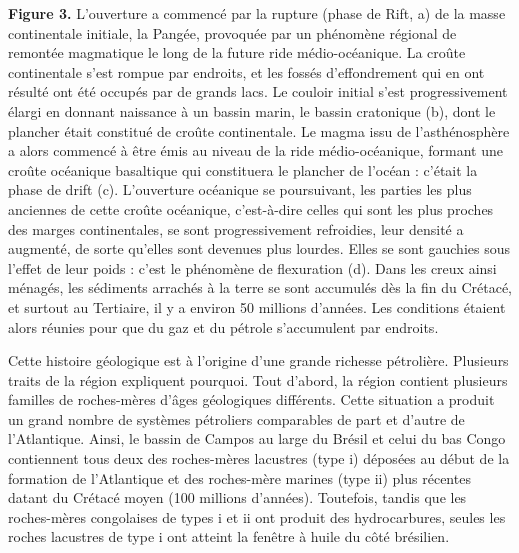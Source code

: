 \documentclass[8pt]{article}
\begin{document}
\begin{tcolorbox}[colback=white]
	\begin{center}
	\end{center}
	\textbf{Figure 3.} L’ouverture a commencé par la rupture (phase de Rift, a) de la masse continentale initiale, la Pangée, provoquée par un phénomène régional
	de remontée magmatique le long de la future ride médio-océanique.
	La croûte continentale s’est rompue par endroits, et les fossés d’effondrement qui en ont résulté ont été occupés par de grands lacs. Le couloir initial s’est progressivement élargi en donnant naissance à un bassin
	marin, le bassin cratonique (b), dont le plancher était constitué de croûte
	continentale. Le magma issu de l’asthénosphère a alors commencé à
	être émis au niveau de la ride médio-océanique, formant une croûte océanique basaltique qui constituera le plancher de l’océan : c’était la phase
	de drift (c). L’ouverture océanique se poursuivant, les parties les plus
	anciennes de cette croûte océanique, c’est-à-dire celles qui sont les plus
	proches des marges continentales, se sont progressivement refroidies,
	leur densité a augmenté, de sorte qu’elles sont devenues plus lourdes.
	Elles se sont gauchies sous l’effet de leur poids : c’est le phénomène de
	flexuration (d). Dans les creux ainsi ménagés, les sédiments arrachés
	à la terre se sont accumulés dès la fin du Crétacé, et surtout au Tertiaire, il y a environ 50 millions d’années. Les conditions étaient alors
	réunies pour que du gaz et du pétrole s’accumulent par endroits.
\end{tcolorbox}

\newpage
Cette histoire géologique est à l'origine d'une grande richesse pétrolière. Plusieurs traits de la région expliquent pourquoi. Tout d'abord, la région contient plusieurs familles de roches-mères d'âges géologiques différents. Cette situation a produit un grand nombre de systèmes pétroliers comparables de part et d'autre de l'Atlantique. Ainsi, le bassin de Campos au large du Brésil et celui du bas Congo contiennent tous deux des roches-mères lacustres (type i) déposées au début de la formation de l'Atlantique et des roches-mère marines (type ii) plus récentes datant du Crétacé moyen (100 millions d'années). Toutefois, tandis que les roches-mères congolaises de types i et ii ont produit des hydrocarbures, seules les roches lacustres de type i ont atteint la fenêtre à huile du côté brésilien.\\
\end{document}
